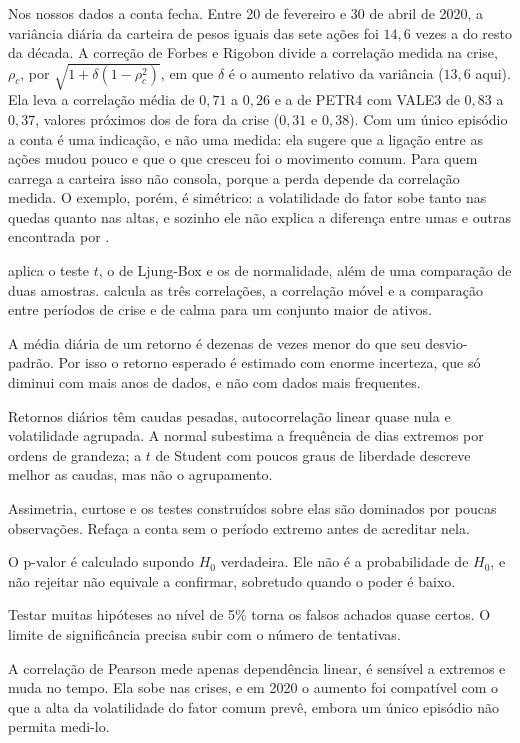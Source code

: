 Nos nossos dados a conta fecha. Entre 20 de fevereiro e 30 de abril de 2020, a variância diária da carteira de pesos iguais das sete ações foi $14,6$ vezes a do resto da década. A correção de Forbes e Rigobon divide a correlação medida na crise, $\rho_c$, por $\sqrt{1 + \delta(1-\rho_c^2)}$, em que $\delta$ é o aumento relativo da variância ($13,6$ aqui). Ela leva a correlação média de $0,71$ a $0,26$ e a de PETR4 com VALE3 de $0,83$ a $0,37$, valores próximos dos de fora da crise ($0,31$ e $0,38$). Com um único episódio a conta é uma indicação, e não uma medida: ela sugere que a ligação entre as ações mudou pouco e que o que cresceu foi o movimento comum. Para quem carrega a carteira isso não consola, porque a perda depende da correlação medida. O exemplo, porém, é simétrico: a volatilidade do fator sobe tanto nas quedas quanto nas altas, e sozinho ele não explica a diferença entre umas e outras encontrada por \citet{longin2001}.

\begin{repositorio}
 aplica o teste $t$, o de Ljung-Box e os de normalidade, além de uma comparação de duas amostras.  calcula as três correlações, a correlação móvel e a comparação entre períodos de crise e de calma para um conjunto maior de ativos.
\end{repositorio}

\begin{resumo}
  \item A média diária de um retorno é dezenas de vezes menor do que seu desvio-padrão. Por isso o retorno esperado é estimado com enorme incerteza, que só diminui com mais anos de dados, e não com dados mais frequentes.
  \item Retornos diários têm caudas pesadas, autocorrelação linear quase nula e volatilidade agrupada. A normal subestima a frequência de dias extremos por ordens de grandeza; a $t$ de Student com poucos graus de liberdade descreve melhor as caudas, mas não o agrupamento.
  \item Assimetria, curtose e os testes construídos sobre elas são dominados por poucas observações. Refaça a conta sem o período extremo antes de acreditar nela.
  \item O p-valor é calculado supondo $H_0$ verdadeira. Ele não é a probabilidade de $H_0$, e não rejeitar não equivale a confirmar, sobretudo quando o poder é baixo.
  \item Testar muitas hipóteses ao nível de 5\% torna os falsos achados quase certos. O limite de significância precisa subir com o número de tentativas.
  \item A correlação de Pearson mede apenas dependência linear, é sensível a extremos e muda no tempo. Ela sobe nas crises, e em 2020 o aumento foi compatível com o que a alta da volatilidade do fator comum prevê, embora um único episódio não permita medi-lo.
\end{resumo}

